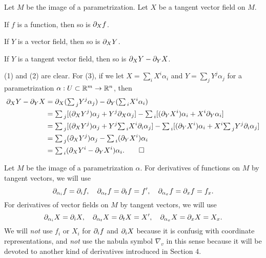 \documentclass{../../large}
\def\a{\alpha}
\def\ssum{{\textstyle\sum\,}}
\begin{document}
\begin{prop}
Let $M$ be the image of a parametrization.
Let $X$ be a tangent vector field on $M$.
\begin{parts}
\item If $f$ is a function, then so is $\pd_Xf$.
\item If $Y$ is a vector field, then so is $\pd_XY$.
\item If $Y$ is a tangent vector field, then so is $\pd_XY-\pd_YX$.
\end{parts}
\end{prop}
\begin{pf}
(1) and (2) are clear.
For (3), if we let $X=\sum_iX^i\a_i$ and $Y=\sum_jY^j\a_j$ for a parametrization $\a:U\subset\R^m\to\R^n$, then
\begin{align*}
\pd_XY-\pd_YX
&=\pd_X(\ssum_jY^j\a_j)-\pd_Y(\ssum_iX^i\a_i)\\
&=\ssum_j[(\pd_XY^j)\a_j+Y^j\pd_X\a_j]-\ssum_i[(\pd_YX^i)\a_i+X^i\pd_Y\a_i]\\
&=\ssum_j[(\pd_XY^j)\a_j+Y^j\ssum_iX^i\pd_i\a_j]-\ssum_i[(\pd_YX^i)\a_i+X^i\ssum_jY^j\pd_i\a_j]\\
&=\ssum_j(\pd_XY^j)\a_j-\ssum_i(\pd_YX^i)\a_i\\
&=\ssum_i(\pd_XY^i-\pd_YX^i)\a_i.\qedhere
\end{align*}
\end{pf}

\begin{notn*}
Let $M$ be the image of a parametrization $\a$.
For derivatives of functions on $M$ by tangent vectors, we will use
\[\pd_{\a_i}f=\pd_if,\quad\pd_{\a_t}f=\pd_tf=f',\quad\pd_{\a_x}f=\pd_xf=f_x.\]
For derivatives of vector fields on $M$ by tangent vectors, we will use
\[\pd_{\a_i}X=\pd_iX,\quad\pd_{\a_t}X=\pd_tX=X',\quad\pd_{\a_x}X=\pd_xX=X_x.\]
We will \emph{not} use $f_i$ or $X_i$ for $\pd_if$ and $\pd_iX$ because it is confusig with coordinate representations, and \emph{not} use the nabula symbol $\nabla_v$ in this sense because it will be devoted to another kind of derivatives introduced in Section 4.
\end{notn*}
\end{document}
